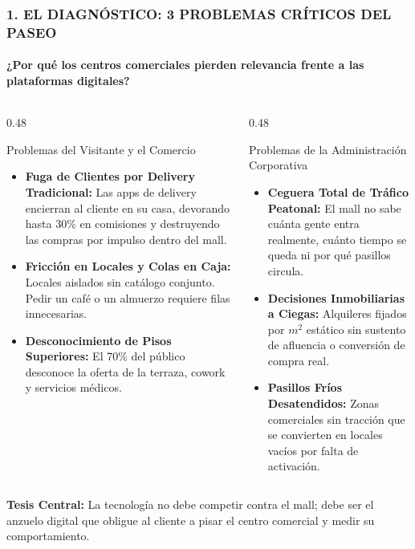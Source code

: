 \documentclass[aspectratio=169, 10pt]{beamer}
\begin{document}
\begin{frame}
  \frametitle{1. EL DIAGNÓSTICO: 3 PROBLEMAS CRÍTICOS DEL PASEO}
  \framesubtitle{¿Por qué los centros comerciales pierden relevancia frente a las plataformas digitales?}

  \begin{columns}[T]
    \begin{column}{0.48\textwidth}
      \begin{alertblock}{Problemas del Visitante y el Comercio}
        \footnotesize
        \begin{itemize}\setlength\itemsep{0.35em}
          \item \textbf{Fuga de Clientes por Delivery Tradicional:} Las apps de delivery encierran al cliente en su casa, devorando hasta 30\% en comisiones y destruyendo las compras por impulso dentro del mall.
          \item \textbf{Fricción en Locales y Colas en Caja:} Locales aislados sin catálogo conjunto. Pedir un café o un almuerzo requiere filas innecesarias.
          \item \textbf{Desconocimiento de Pisos Superiores:} El 70\% del público desconoce la oferta de la terraza, cowork y servicios médicos.
        \end{itemize}
      \end{alertblock}
    \end{column}

    \begin{column}{0.48\textwidth}
      \begin{block}{Problemas de la Administración Corporativa}
        \footnotesize
        \begin{itemize}\setlength\itemsep{0.35em}
          \item \textbf{Ceguera Total de Tráfico Peatonal:} El mall no sabe cuánta gente entra realmente, cuánto tiempo se queda ni por qué pasillos circula.
          \item \textbf{Decisiones Inmobiliarias a Ciegas:} Alquileres fijados por $m^2$ estático sin sustento de afluencia o conversión de compra real.
          \item \textbf{Pasillos Fríos Desatendidos:} Zonas comerciales sin tracción que se convierten en locales vacíos por falta de activación.
        \end{itemize}
      \end{block}
    \end{column}
  \end{columns}

  \vskip 0.25cm
  \centering
  \color{AranjuezGold}\footnotesize \textbf{Tesis Central:} La tecnología no debe competir contra el mall; debe ser el anzuelo digital que obligue al cliente a pisar el centro comercial y medir su comportamiento.
\end{frame}
\end{document}
